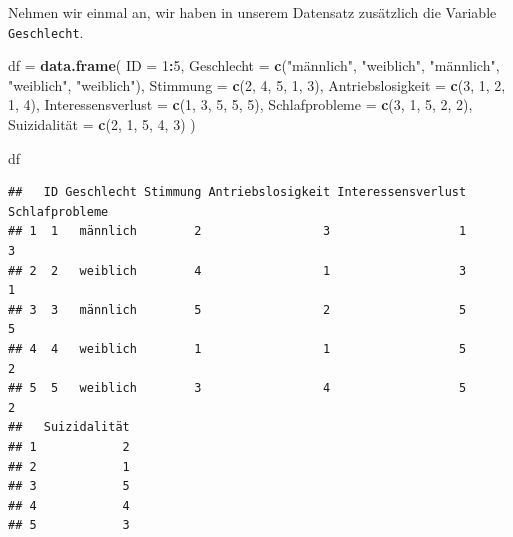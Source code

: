 \documentclass[
]{book}
\newenvironment{Shaded}{\begin{snugshade}}{\end{snugshade}}
\newcommand{\AttributeTok}[1]{\textcolor[rgb]{0.13,0.29,0.53}{#1}}
\newcommand{\DecValTok}[1]{\textcolor[rgb]{0.00,0.00,0.81}{#1}}
\newcommand{\FunctionTok}[1]{\textcolor[rgb]{0.13,0.29,0.53}{\textbf{#1}}}
\newcommand{\NormalTok}[1]{#1}
\newcommand{\OtherTok}[1]{\textcolor[rgb]{0.56,0.35,0.01}{#1}}
\newcommand{\SpecialCharTok}[1]{\textcolor[rgb]{0.81,0.36,0.00}{\textbf{#1}}}
\newcommand{\StringTok}[1]{\textcolor[rgb]{0.31,0.60,0.02}{#1}}
\begin{document}
Nehmen wir einmal an, wir haben in unserem Datensatz zusätzlich die Variable \texttt{Geschlecht}.

\begin{Shaded}
\begin{Highlighting}[]
\NormalTok{df }\OtherTok{=} \FunctionTok{data.frame}\NormalTok{(}
  \AttributeTok{ID =} \DecValTok{1}\SpecialCharTok{:}\DecValTok{5}\NormalTok{,}
  \AttributeTok{Geschlecht =} \FunctionTok{c}\NormalTok{(}\StringTok{"männlich"}\NormalTok{, }\StringTok{"weiblich"}\NormalTok{, }\StringTok{"männlich"}\NormalTok{, }\StringTok{"weiblich"}\NormalTok{, }\StringTok{"weiblich"}\NormalTok{),}
  \AttributeTok{Stimmung =} \FunctionTok{c}\NormalTok{(}\DecValTok{2}\NormalTok{, }\DecValTok{4}\NormalTok{, }\DecValTok{5}\NormalTok{, }\DecValTok{1}\NormalTok{, }\DecValTok{3}\NormalTok{),}
  \AttributeTok{Antriebslosigkeit =} \FunctionTok{c}\NormalTok{(}\DecValTok{3}\NormalTok{, }\DecValTok{1}\NormalTok{, }\DecValTok{2}\NormalTok{, }\DecValTok{1}\NormalTok{, }\DecValTok{4}\NormalTok{),}
  \AttributeTok{Interessensverlust =} \FunctionTok{c}\NormalTok{(}\DecValTok{1}\NormalTok{, }\DecValTok{3}\NormalTok{, }\DecValTok{5}\NormalTok{, }\DecValTok{5}\NormalTok{, }\DecValTok{5}\NormalTok{),}
  \AttributeTok{Schlafprobleme =} \FunctionTok{c}\NormalTok{(}\DecValTok{3}\NormalTok{, }\DecValTok{1}\NormalTok{, }\DecValTok{5}\NormalTok{, }\DecValTok{2}\NormalTok{, }\DecValTok{2}\NormalTok{),}
\NormalTok{  Suizidalität }\OtherTok{=} \FunctionTok{c}\NormalTok{(}\DecValTok{2}\NormalTok{, }\DecValTok{1}\NormalTok{, }\DecValTok{5}\NormalTok{, }\DecValTok{4}\NormalTok{, }\DecValTok{3}\NormalTok{)}
\NormalTok{)}

\NormalTok{df}
\end{Highlighting}
\end{Shaded}

\begin{verbatim}
##   ID Geschlecht Stimmung Antriebslosigkeit Interessensverlust Schlafprobleme
## 1  1   männlich        2                 3                  1              3
## 2  2   weiblich        4                 1                  3              1
## 3  3   männlich        5                 2                  5              5
## 4  4   weiblich        1                 1                  5              2
## 5  5   weiblich        3                 4                  5              2
##   Suizidalität
## 1            2
## 2            1
## 3            5
## 4            4
## 5            3
\end{verbatim}
\end{document}
